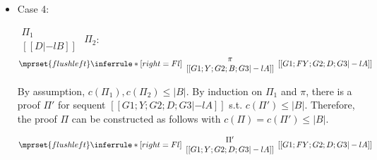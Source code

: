 \begin{itemize}
\item Case 4:
      \begin{center}
        \scriptsize
        \begin{math}
          \begin{array}{c}
            \Pi_1 \\
            {[[D |-l B]]}
          \end{array}
        \end{math}
        \qquad\qquad
        $\Pi_2$:
        \begin{math}
          $$\mprset{flushleft}
          \inferrule* [right={\tiny Fl}] {
            {
              \begin{array}{c}
                \pi \\
                {[[G1; Y; G2; B; G3 |-l A]]}
              \end{array}
            }
          }{[[G1; F Y; G2; D; G3 |-l A]]}
        \end{math}
      \end{center}
      By assumption, $c(\Pi_1),c(\Pi_2)\leq |B|$. By induction on $\Pi_1$
      and $\pi$, there is a proof $\Pi'$ for sequent
      $[[G1; Y; G2; D; G3 |-l A]]$ s.t. $c(\Pi') \leq |B|$. Therefore, the
      proof $\Pi$ can be constructed as follows with
      $c(\Pi) = c(\Pi') \leq |B|$.
      \begin{center}
        \scriptsize
        \begin{math}
          $$\mprset{flushleft}
          \inferrule* [right={\tiny Fl}] {
            {
              \begin{array}{c}
                \Pi' \\
                {[[G1; Y; G2; D; G3 |-l A]]}
              \end{array}
            }
          }{[[G1; F Y; G2; D; G3 |-l A]]}
        \end{math}
      \end{center}
\end{itemize}




